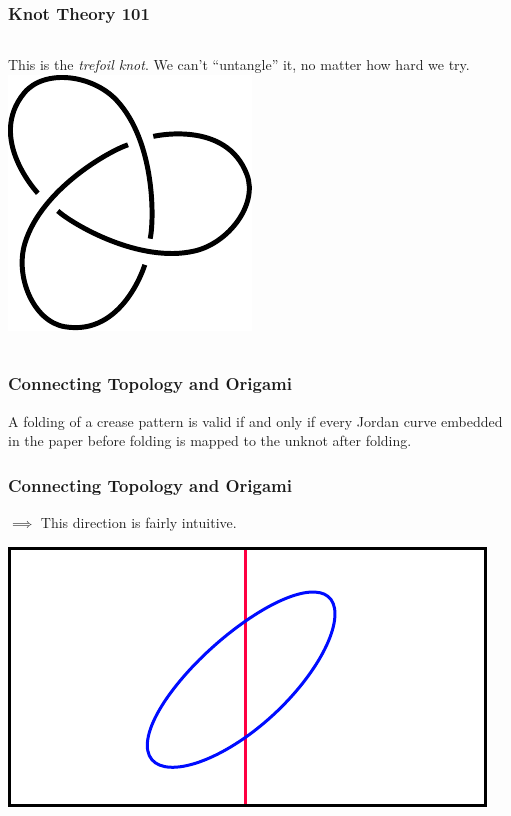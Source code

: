 \documentclass{beamer}
\begin{document}
\begin{frame}
\frametitle{Knot Theory 101}
\begin{columns}[c]
This is the \textit{trefoil knot}. We can't ``untangle'' it, no matter how hard we try. 
\includegraphics[width=\textwidth]{knot_pix/trefoil}
\end{columns}
\end{frame}


\begin{frame}
\frametitle{Connecting Topology and Origami}
\begin{theorem}
A folding of a crease pattern is valid if and only if every Jordan curve embedded in the paper before folding is mapped to the unknot after folding. 
\end{theorem}
\end{frame}

\begin{frame}
\frametitle{Connecting Topology and Origami}
\begin{block}{$\implies$}
This direction is fairly intuitive. 
\end{block}
\pause
\begin{center}
\includegraphics[width=.6\textwidth]{knot_pix/trivial-1.pdf}
\end{center}
\end{frame}
\end{document}
